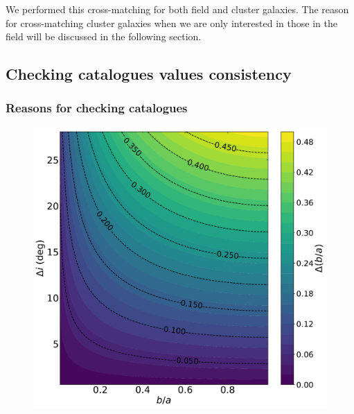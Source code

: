 We performed this cross-matching for both field and cluster galaxies. The reason for cross-matching cluster galaxies when we are only interested in those in the field will be discussed in the following section.

\subsection{Checking catalogues values consistency}
\subsubsection{Reasons for checking catalogues}

\begin{figure}[H]
	\centering
	\begin{minipage}[c]{0.49\linewidth}
		\includegraphics[width=\linewidth]{../Plots/Error_on_inc_versus_b_a.pdf}
	\end{minipage}
	\hfill
	\begin{minipage}[c]{0.49\linewidth}

\end{minipage}
\end{figure}
